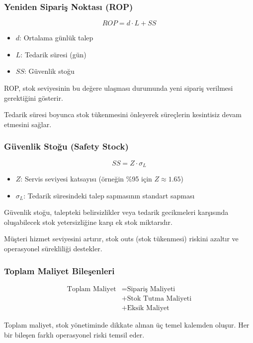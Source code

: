 \documentclass[12pt]{beamer}
\begin{document}
\begin{frame}
	\frametitle{Yeniden Sipariş Noktası (ROP)}
	\begin{equation}
		ROP = d \cdot L + SS
	\end{equation}
	\begin{itemize}
		\item $d$: Ortalama günlük talep
		\item $L$: Tedarik süresi (gün)
		\item $SS$: Güvenlik stoğu
	\end{itemize}

	\begin{tcolorbox}
		ROP, stok seviyesinin bu değere ulaşması durumunda yeni sipariş
		verilmesi gerektiğini gösterir.
	\end{tcolorbox}

	\begin{tcolorbox}
		Tedarik süresi boyunca stok tükenmesini önleyerek süreçlerin
		kesintisiz devam etmesini sağlar.
	\end{tcolorbox}
\end{frame}

\begin{frame}
	\frametitle{Güvenlik Stoğu (Safety Stock)}
	\begin{equation}
		SS = Z \cdot \sigma_L
	\end{equation}
	\begin{itemize}
		\item $Z$: Servis seviyesi katsayısı (örneğin \%95 için $Z
			      \approx 1.65$)
		\item $\sigma_L$: Tedarik süresindeki talep sapmasının standart
		      sapması
	\end{itemize}

	\begin{tcolorbox}
		Güvenlik stoğu, talepteki belirsizlikler veya tedarik
		gecikmeleri karşısında oluşabilecek stok yetersizliğine karşı ek stok
		miktarıdır.
	\end{tcolorbox}

	\begin{tcolorbox}
		Müşteri hizmet seviyesini artırır, stok outs (stok tükenmesi)
		riskini azaltır ve operasyonel sürekliliği destekler.
	\end{tcolorbox}
\end{frame}

\begin{frame}
	\frametitle{Toplam Maliyet Bileşenleri}
	\begin{align}
		\text{Toplam Maliyet} & = \text{Sipariş Maliyeti} \nonumber              \\
		                      & + \text{Stok Tutma Maliyeti} \nonumber           \\
		                      & + \text{Eksik Maliyet} \label{eq:toplam_maliyet}
	\end{align}

	\begin{tcolorbox}
		Toplam maliyet, stok yönetiminde dikkate alınan üç temel
		kalemden oluşur. Her bir bileşen farklı operasyonel riski temsil eder.
	\end{tcolorbox}
\end{frame}
\end{document}
